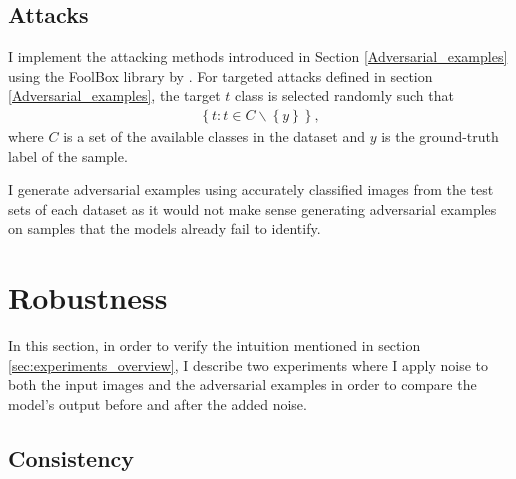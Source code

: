 \subsection{Attacks}
\label{sec:attack}
I implement the attacking methods introduced in Section
\ref{Adversarial_examples} using the FoolBox library by
\cite{rauber_foolbox_2020}. For targeted attacks defined in section
\ref{Adversarial_examples}, the target $t$ class is selected randomly such that
\begin{align} \label{eq:targeted}
    \left\{ t:t\in C \backslash \left\{
    y\right\}\right\},
\end{align}
where $C$ is a set of the available classes in the dataset and $y$ is the
ground-truth label of the sample.

I generate adversarial examples using accurately classified images from the test
sets of each dataset as it would not make sense generating adversarial examples
on samples that the models already fail to identify.

\section{Robustness}
\label{sec:robustness}

In this section, in order to verify the intuition mentioned in section
\ref{sec:experiments_overview}, I describe two experiments where I apply noise
to both the input images and the adversarial examples in order to compare the
model's output before and after the added noise.


\subsection{Consistency}
\label{sub:consistency}

